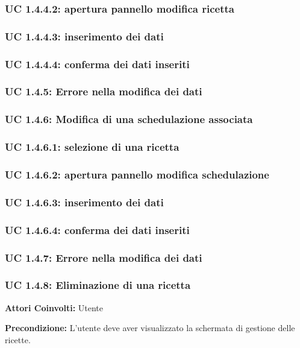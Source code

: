 \subsubsection{UC 1.4.4.2: apertura pannello modifica ricetta}
\subsubsection{UC 1.4.4.3: inserimento dei dati}
\subsubsection{UC 1.4.4.4: conferma dei dati inseriti}
\subsubsection{UC 1.4.5: Errore nella modifica dei dati}
\subsubsection{UC 1.4.6: Modifica di una schedulazione associata}
\subsubsection{UC 1.4.6.1: selezione di una ricetta}
\subsubsection{UC 1.4.6.2: apertura pannello modifica schedulazione}
\subsubsection{UC 1.4.6.3: inserimento dei dati}
\subsubsection{UC 1.4.6.4: conferma dei dati inseriti}
\subsubsection{UC 1.4.7: Errore nella modifica dei dati}

\subsubsection{UC 1.4.8: Eliminazione di una ricetta}

\textbf{Attori Coinvolti:}
Utente

\textbf{Precondizione:}
L’utente deve aver visualizzato la schermata di gestione delle ricette.

